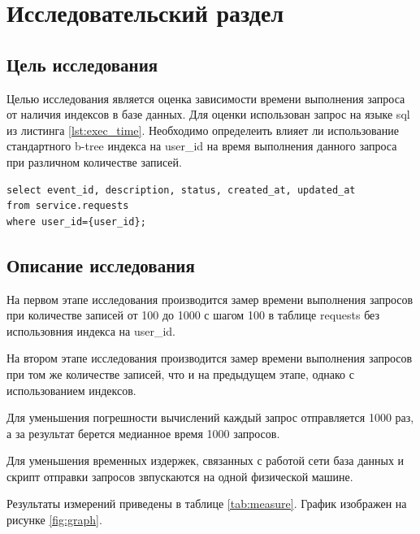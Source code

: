 \section{Исследовательский раздел} \label{research}

\subsection{Цель исследования}

Целью исследования является оценка зависимости времени выполнения запроса от наличия индексов в базе данных. Для оценки использован запрос на языке sql\cite{sql} из листинга \ref{lst:exec_time}. Необходимо определеить влияет ли использование стандартного b-tree индекса на user{\_}id  на время выполнения данного запроса при различном количестве записей.

\begin{lstlisting}[label=lst:exec_time, caption=Запрос для исследования]
select event_id, description, status, created_at, updated_at
from service.requests
where user_id={user_id};
\end{lstlisting}

\subsection{Описание исследования}

На первом этапе исследования производится замер времени выполнения запросов при количестве записей от 100 до 1000 с шагом 100 в таблице requests без использовния индекса на user{\_}id.

На втором этапе исследования производится замер времени выполнения запросов при том же количестве записей, что и на предыдущем этапе, однако с использованием индексов.

Для уменьшения погрешности вычислений каждый запрос отправляется 1000 раз, а за результат берется медианное время 1000 запросов.

Для уменьшения временных издержек, связанных с работой сети база данных и скрипт отправки запросов звпускаются на одной физической машине.

Результаты измерений приведены в таблице \ref{tab:measure}. График изображен на рисунке \ref{fig:graph}.

\pagebreak

